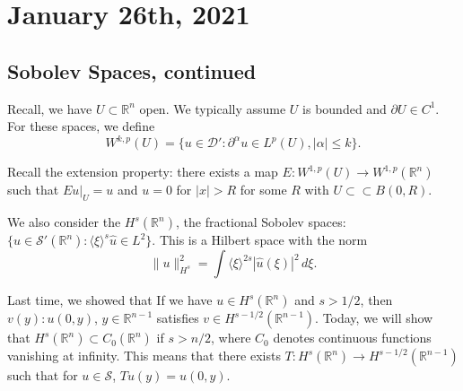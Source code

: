 \documentclass[12pt]{scrartcl}
\newcommand{\R}{\mathbb{R}}
\renewcommand{\hat}{\widehat}
\newcommand{\<}{\langle}
\renewcommand{\>}{\rangle}
\let \mc \mathcal
\begin{document}
\section{January 26th, 2021}
\subsection{Sobolev Spaces, continued}
Recall, we have $U \subset \R^n$ open.  We typically assume $U$ is bounded and $\partial U \in C^1$.  For these spaces, we define $$W^{k, p}(U) = \{u \in \mc D' : \partial^{\alpha} u \in L^p(U), |\alpha| \le k\}.$$

Recall the extension property: there exists a map $E: W^{1, p}(U) \to W^{1, p}(\R^n)$ such that $Eu\vert_U = u$ and $u = 0$ for $|x| > R$ for some $R$ with $U \subset \subset B(0, R)$.

We also consider the $H^s(\R^n)$, the fractional Sobolev spaces: $\{u \in \mc S'(\R^n) : \<\xi \>^s \hat{u} \in L^2\}.$  This is a Hilbert space with the norm 
$$\|u\|_{H^s}^2 = \int \<\xi\>^{2s} |\hat{u}(\xi)|^2\,d\xi.$$

Last time, we showed that If we have $u \in H^s(\R^n)$ and $s > 1/2$, then $v(y) : u(0, y)$, $y \in \R^{n-1}$ satisfies $v \in H^{s - 1/2}(\R^{n-1})$.  Today, we will show that $H^s(\R^n) \subset C_0(\R^n)$ if $s > n/2$, where $C_0$ denotes continuous functions vanishing at infinity.  This means that there exists $T: H^s(\R^n) \to H^{s - 1/2}(\R^{n-1})$ such that for $u \in \mc S$, $Tu(y) = u(0, y)$.  
\end{document}
